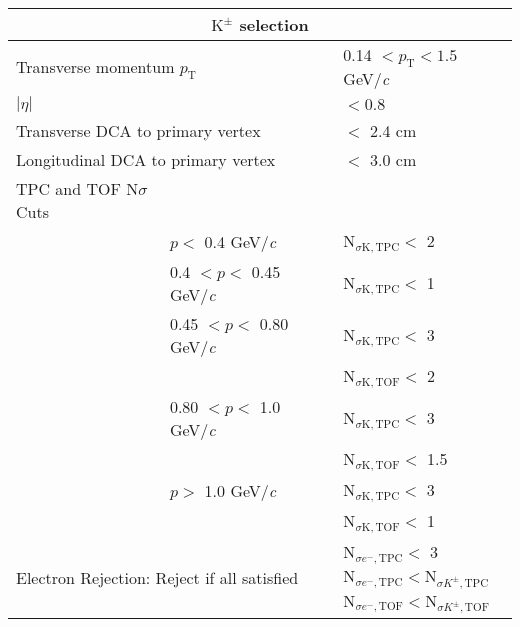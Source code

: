 \documentclass[ALICE,manyauthors]{cernphprep}
\newcommand{\Kpm}{$\mathrm{K^{\pm}}$\xspace}
\begin{document}
\begin{table}[htbp]
 \centering
  \begin{tabular}{lc|c|l}
   \hline  
   \multicolumn{4}{c}{\textbf{\Kpm selection}} \\
   \hline
   \multicolumn{3}{l|}{Transverse momentum $p_{\mathrm{T}}$} & 0.14 $< p_{\mathrm{T}} < 1.5$ GeV/\textit{c} \\
   \hline
   \multicolumn{3}{l|}{$|\eta|$} & $< 0.8$ \\
   \hline
   \multicolumn{3}{l|}{Transverse DCA to primary vertex} & $<$ 2.4 cm \\
   \hline
   \multicolumn{3}{l|}{Longitudinal DCA to primary vertex} & $<$ 3.0 cm \\
   \hline

   TPC and TOF N$\sigma$ Cuts & \multicolumn{3}{c}{} \\
   \cline{2-4}
    & \multicolumn{1}{l}{$p <$ 0.4 GeV/\textit{c}} &  & N$_{\sigma \mathrm{K,TPC}} <$ 2 \\
   \cline{2-4}
    & \multicolumn{1}{l}{0.4 $< p <$ 0.45 GeV/\textit{c}} & & N$_{\sigma \mathrm{K,TPC}} <$ 1 \\
   \cline{2-4}     
    & \multicolumn{1}{l}{0.45 $< p <$ 0.80 GeV/\textit{c}} & & N$_{\sigma \mathrm{K,TPC}} <$ 3 \\ 
   \multicolumn{3}{c|}{} & N$_{\sigma \mathrm{K,TOF}} <$ 2 \\
   \cline{2-4}
    & \multicolumn{1}{l}{0.80 $< p <$ 1.0 GeV/\textit{c}} & & N$_{\sigma \mathrm{K,TPC}} <$ 3 \\
   \multicolumn{3}{c|}{} & N$_{\sigma \mathrm{K,TOF}} <$ 1.5 \\  
   \cline{2-4}
    & \multicolumn{1}{l}{$p >$ 1.0 GeV/\textit{c}} & & N$_{\sigma \mathrm{K,TPC}} <$ 3 \\
   \multicolumn{3}{c|}{} & N$_{\sigma \mathrm{K,TOF}} <$ 1 \\  
   \hline
   \multicolumn{3}{l|}{\multirow{3}{*}{Electron Rejection: Reject if all satisfied}} & $\mathrm{N}_{\sigma e^{-},\mathrm{TPC}} < $ 3 \\
   \multicolumn{3}{c|}{} & $\mathrm{N}_{\sigma e^{-},\mathrm{TPC}} < \mathrm{N}_{\sigma K^{\pm},\mathrm{TPC}}$ \\
   \multicolumn{3}{c|}{} & $\mathrm{N}_{\sigma e^{-},\mathrm{TOF}} < \mathrm{N}_{\sigma K^{\pm},\mathrm{TOF}}$ \\
   \hline
   

\end{tabular}
\end{table}
\end{document}
